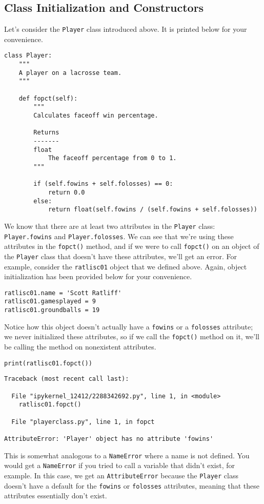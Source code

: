 \subsection{Class Initialization and Constructors}
Let's consider the \verb|Player| class introduced above. It is printed below for your convenience.
\begin{lstlisting}[style=pippython]
class Player:
	"""
	A player on a lacrosse team.
	"""

	def fopct(self):
		"""
		Calculates faceoff win percentage.
		
		Returns
		-------
		float
			The faceoff percentage from 0 to 1.
		"""
		
		if (self.fowins + self.folosses) == 0:
			return 0.0
		else:
			return float(self.fowins / (self.fowins + self.folosses))
\end{lstlisting}
We know that there are at least two attributes in the \verb|Player| class: \verb|Player.fowins| and \verb|Player.folosses|. We can see that we're using these attributes in the \verb|fopct()| method, and if we were to call \verb|fopct()| on an object of the \verb|Player| class that doesn't have these attributes, we'll get an error. For example, consider the \verb|ratlisc01| object that we defined above. Again, object initialization has been provided below for your convenience.\par
\begin{lstlisting}[style=pippython]
ratlisc01.name = 'Scott Ratliff'
ratlisc01.gamesplayed = 9
ratlisc01.groundballs = 19
\end{lstlisting}
Notice how this object doesn't actually have a \verb|fowins| or a \verb|folosses| attribute; we never initialized these attributes, so if we call the \verb|fopct()| method on it, we'll be calling the method on nonexistent attributes.
\begin{lstlisting}[style=pippython]
print(ratlisc01.fopct())
\end{lstlisting}
\begin{lstlisting}[style=none]
Traceback (most recent call last):

  File "ipykernel_12412/2288342692.py", line 1, in <module>
    ratlisc01.fopct()

  File "playerclass.py", line 1, in fopct

AttributeError: 'Player' object has no attribute 'fowins'
\end{lstlisting}
This is somewhat analogous to a \verb|NameError| where a name is not defined. You would get a \verb|NameError| if you tried to call a variable that didn't exist, for example. In this case, we get an \verb|AttributeError| because the \verb|Player| class doesn't have a default for the \verb|fowins| or \verb|folosses| attributes, meaning that these attributes essentially don't exist.\par
